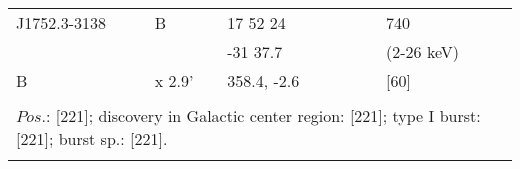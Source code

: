 \documentclass{aa}
\begin{document}
\begin{tabular}{p{2.5cm}p{1cm}p{1.8cm}p{2.3cm}p{3.3cm}p{2.0cm}p{2.2cm}}
\noalign{\smallskip}
J1752.3-3138  & B         & 17 52 24       &                  &                        & 740                   &          \\
                           &             & -31 37.7        &                  &                        & (2-26 keV)      &    \\
B                        & x 2.9'   & 358.4, -2.6     &                  &                        & [60]                   &         \\
\\
\multicolumn{7}{p{17.5cm}}{
$Pos$.: [221]; discovery in Galactic center region: [221]; type I burst: [221]; burst sp.: [221].}\\
\noalign{\smallskip}
\hline

\end{tabular}
\end{document}
